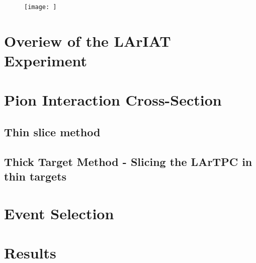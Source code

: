 \documentclass[%
 reprint,
 amsmath,amssymb,
 aps,
]{revtex4-1}
\begin{document}
\begin{figure}[htpc]
\texttt{[image: ]}
\caption{\label{fig:}} 
\end{figure}

\section{Overiew of the LArIAT Experiment}\label{sec:LArIAT}

\section{Pion Interaction Cross-Section}\label{sec:PiCrossSection}

\subsection{Thin slice method}\label{sec:ThinSlice}

\subsection{Thick Target Method - Slicing the LArTPC in thin targets}

\section{Event Selection}\label{sec:EventSelection}

\section{Results}\label{sec:Results}

\end{document}
